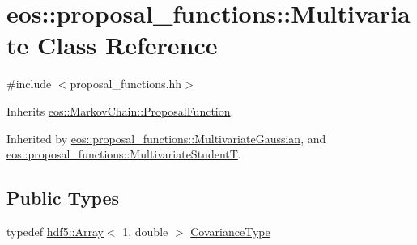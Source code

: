 \hypertarget{classeos_1_1proposal__functions_1_1Multivariate}{
\section{eos::proposal\_\-functions::Multivariate Class Reference}
\label{classeos_1_1proposal__functions_1_1Multivariate}
}


{\ttfamily \#include $<$proposal\_\-functions.hh$>$}

Inherits \hyperlink{structeos_1_1MarkovChain_1_1ProposalFunction}{eos::MarkovChain::ProposalFunction}.

Inherited by \hyperlink{classeos_1_1proposal__functions_1_1MultivariateGaussian}{eos::proposal\_\-functions::MultivariateGaussian}, and \hyperlink{classeos_1_1proposal__functions_1_1MultivariateStudentT}{eos::proposal\_\-functions::MultivariateStudentT}.\subsection*{Public Types}
\begin{DoxyCompactItemize}
\item 
typedef \hyperlink{classeos_1_1hdf5_1_1Array}{hdf5::Array}$<$ 1, double $>$ \hyperlink{classeos_1_1proposal__functions_1_1Multivariate_ae7eae33da3e528eea02bd653e83f865a}{CovarianceType}
\end{DoxyCompactItemize}

